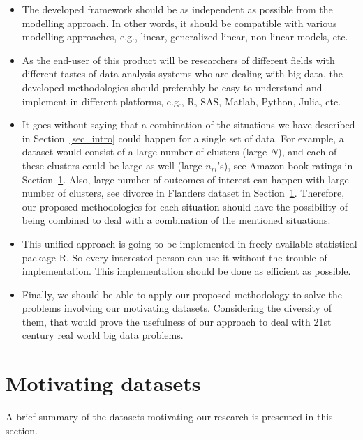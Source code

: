 \documentclass[14pt]{article}
\begin{document}
\begin{itemize}
\item The developed framework should be as independent as possible from the modelling approach. In other words, it should be compatible with various modelling approaches, e.g.,  linear, generalized linear, non-linear models, etc.
\item As the end-user of this product will be researchers of different fields with different tastes of data analysis systems who are dealing with big data, the developed methodologies should preferably be easy to understand and implement in different platforms, e.g., \textsf{R}, \textsf{SAS}, \textsf{Matlab}, \textsf{Python}, \textsf{Julia}, etc.
\item It goes without saying that a combination of the situations we have described in Section~\ref{sec_intro} could happen for a single set of data. For example, a dataset would consist of a large number of clusters (large $N$), and each of these clusters could be large as well (large $n_{ri}$'s), see Amazon book ratings in Section~\ref{sec_data_sets}. Also, large number of outcomes of interest can happen with large number of clusters, see divorce in Flanders dataset in Section~\ref{sec_data_sets}. Therefore, our proposed methodologies for each situation should have the possibility of being combined to deal with a combination of the mentioned situations.
\item This unified approach is going to be implemented in freely available statistical package \textsf{R}. So every interested person can use it without the trouble of implementation. This implementation should be done as efficient as possible.
\item Finally, we should be able to apply our proposed methodology to solve the problems involving our motivating datasets. Considering the diversity of them, that would prove the usefulness of our approach to deal with 21st century real world big data problems.
\end{itemize}




\section{Motivating datasets}
\label{sec_data_sets}
A brief summary of the datasets motivating our research is presented in this section.
\end{document}
